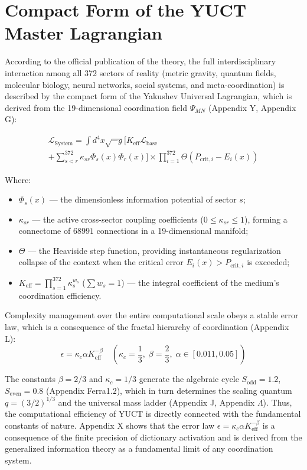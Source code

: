 \documentclass[12pt,a4paper]{article}
\begin{document}
	\section{Compact Form of the YUCT Master Lagrangian}
	According to the official publication of the theory, the full interdisciplinary interaction among all 372 sectors of reality (metric gravity, quantum fields, molecular biology, neural networks, social systems, and meta-coordination) is described by the compact form of the Yakushev Universal Lagrangian, which is derived from the 19-dimensional coordination field \(\Psi_{MN}\) (Appendix Y, Appendix G):
	
	\begin{multline}
		\mathscr{L}_{\text{System}} = \int d^4x \sqrt{-g} \Bigg[ K_{\text{eff}} \mathscr{L}_{\text{base}} \\
		+ \sum_{s<r}^{372} \kappa_{sr} \Phi_s(x) \Phi_r(x) \Bigg] \times \prod_{i=1}^{372} \Theta(P_{\text{crit},i} - E_i(x))
	\end{multline}
	
	Where:
	\begin{itemize}
		\item \(\Phi_s(x)\) — the dimensionless information potential of sector \(s\);
		\item \(\kappa_{sr}\) — the active cross-sector coupling coefficients (\(0 \le \kappa_{sr} \le 1\)), forming a connectome of \(68991\) connections in a 19-dimensional manifold;
		\item \(\Theta\) — the Heaviside step function, providing instantaneous regularization collapse of the context when the critical error \(E_i(x) > P_{\text{crit},i}\) is exceeded;
		\item \(K_{\text{eff}} = \prod_{s=1}^{372} \kappa_s^{w_s}\) (\(\sum w_s = 1\)) — the integral coefficient of the medium's coordination efficiency.
	\end{itemize}
	
	Complexity management over the entire computational scale obeys a stable error law, which is a consequence of the fractal hierarchy of coordination (Appendix L):
	\begin{equation}
		\epsilon = \kappa_c \alpha K_{\text{eff}}^{-\beta} \quad \left(\kappa_c = \frac{1}{3}, \; \beta = \frac{2}{3}, \; \alpha \in [0.011, 0.05]\right)
	\end{equation}
	
	The constants \(\beta = 2/3\) and \(\kappa_c = 1/3\) generate the algebraic cycle \(S_{\mathrm{odd}} = 1.2\), \(S_{\mathrm{even}} = 0.8\) (Appendix Ferra1.2), which in turn determines the scaling quantum \(q = (3/2)^{1/3}\) and the universal mass ladder (Appendix J, Appendix \(\Lambda\)). Thus, the computational efficiency of YUCT is directly connected with the fundamental constants of nature. Appendix X shows that the error law \(\epsilon = \kappa_c\alpha K_{\mathrm{eff}}^{-\beta}\) is a consequence of the finite precision of dictionary activation and is derived from the generalized information theory as a fundamental limit of any coordination system.
	
\end{document}
